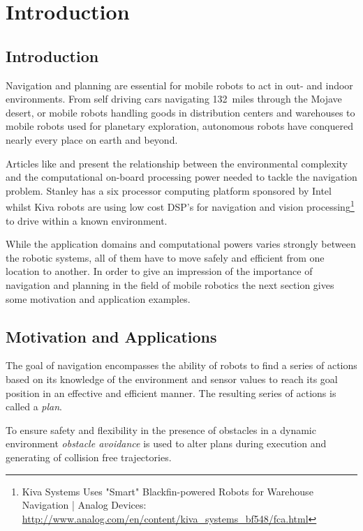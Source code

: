\chapter{Introduction}\label{ch:introduction}
\section{Introduction}
Navigation and planning are essential for mobile robots to act in out- and indoor environments. 
From self driving cars navigating 132~miles through the Mojave desert, or mobile robots handling goods in distribution centers and warehouses to mobile robots used for planetary exploration, autonomous robots have conquered nearly every place on earth and beyond.
 
Articles like \cite{stanley} and \cite{kiva} present the relationship between the environmental complexity and the computational on-board processing power needed to tackle the navigation problem.
Stanley has a six processor computing platform sponsored by Intel whilst Kiva robots are using low cost DSP's for navigation and vision processing\footnote{Kiva Systems Uses "Smart" Blackfin-powered Robots for Warehouse Navigation | Analog Devices: \url{http://www.analog.com/en/content/kiva_systems_bf548/fca.html}} to drive within a known environment.  

While the application domains and computational powers varies strongly between the robotic systems, all of them have to move safely and efficient from one location to another.   
In order to give an impression of the importance of navigation and planning in the field of mobile robotics the next section gives some motivation and application examples.

\section{Motivation and Applications}\label{sec:motivation} 
The goal of navigation encompasses the ability of robots to find a series of actions based on its knowledge of the environment and sensor values to reach its goal position in an effective and efficient manner.
The resulting series of actions is called a \emph{plan}. 

To ensure safety and flexibility in the presence of obstacles in a dynamic environment \emph{obstacle avoidance} is used to alter plans during execution and generating of collision free trajectories.

